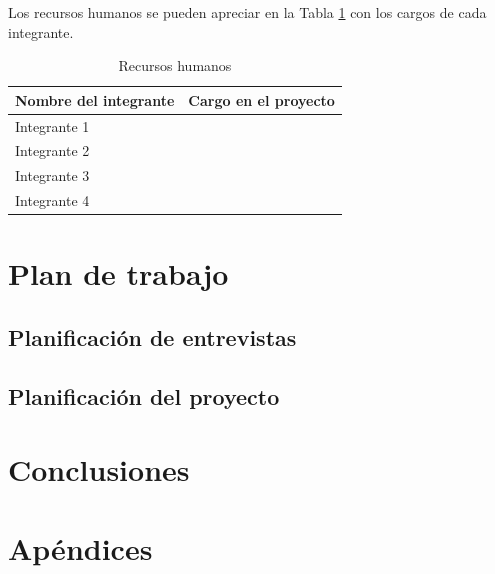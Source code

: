     Los recursos humanos se pueden apreciar en la Tabla \ref{table:rrhh} con los cargos de cada integrante.
    \begin{table}[!ht] %
      \centering %
      \caption{Recursos humanos}\label{table:rrhh} %
      \begin{tabularx}{\textwidth}{|p{4cm}@{}|X|} %
	      \hline 
    	  {\bf Nombre del integrante}     & {\bf Cargo en el proyecto} \\ \hline
      	  {Integrante 1} & {}                     \\ \hline
          {Integrante 2}      & {}                     \\ \hline
          {Integrante 3}      & {}                     \\ \hline
          {Integrante 4}  & {}                     \\ \hline
          \end{tabularx}
    \end{table}

    \section{Plan de trabajo}
    
    \subsection{Planificación de entrevistas}
	
    \subsection{Planificación del proyecto}
    
    \section{Conclusiones}
	
    
    
    \section{Apéndices}

